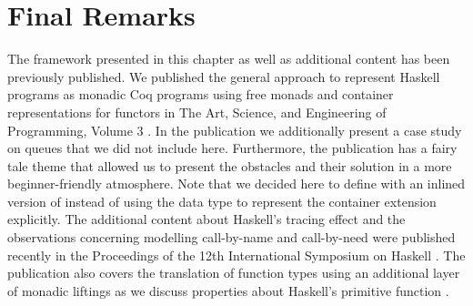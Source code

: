 \section{Final Remarks}

The framework presented in this chapter as well as additional content has been previously published.
We published the general approach to represent Haskell programs as monadic Coq programs using free monads and container representations for functors in The Art, Science, and Engineering of Programming, Volume 3 \citep{dylus2019one}.
In the publication we additionally present a case study on queues that we did not include here.
Furthermore, the publication has a fairy tale theme that allowed us to present the obstacles and their solution in a more beginner-friendly atmosphere.
Note that we decided here to define  with an inlined version of  instead of using the data type to represent the container extension explicitly.
The additional content about Haskell's tracing effect and the observations concerning modelling call-by-name and call-by-need were published recently in the Proceedings of the 12th International Symposium on Haskell \citep{christiansen2019verifying}.
The publication also covers the translation of function types using an additional layer of monadic liftings as we discuss properties about Haskell's primitive function .
